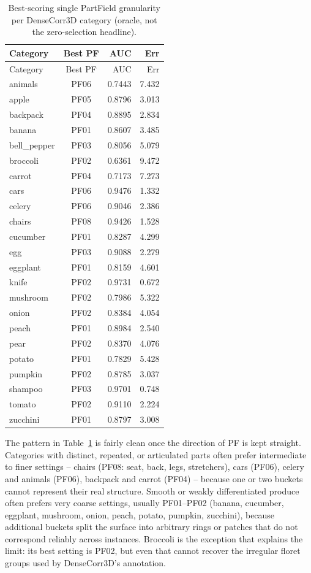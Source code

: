 \documentclass{article}
\begin{document}
\begingroup
\small
\setlength{\tabcolsep}{4pt}
\begin{longtable}{lcrr}
\caption{Best-scoring single PartField granularity per DenseCorr3D category (oracle, not the
zero-selection headline).}
\label{tab:pf-best-per-category}\\
\toprule
Category & Best PF & AUC & Err \\
\midrule
\endfirsthead
\toprule
Category & Best PF & AUC & Err \\
\midrule
\endhead
\bottomrule
\endfoot
animals & PF06 & 0.7443 & 7.432 \\
apple & PF05 & 0.8796 & 3.013 \\
backpack & PF04 & 0.8895 & 2.834 \\
banana & PF01 & 0.8607 & 3.485 \\
bell\_pepper & PF03 & 0.8056 & 5.079 \\
broccoli & PF02 & 0.6361 & 9.472 \\
carrot & PF04 & 0.7173 & 7.273 \\
cars & PF06 & 0.9476 & 1.332 \\
celery & PF06 & 0.9046 & 2.386 \\
chairs & PF08 & 0.9426 & 1.528 \\
cucumber & PF01 & 0.8287 & 4.299 \\
egg & PF03 & 0.9088 & 2.279 \\
eggplant & PF01 & 0.8159 & 4.601 \\
knife & PF02 & 0.9731 & 0.672 \\
mushroom & PF02 & 0.7986 & 5.322 \\
onion & PF02 & 0.8384 & 4.054 \\
peach & PF01 & 0.8984 & 2.540 \\
pear & PF02 & 0.8370 & 4.076 \\
potato & PF01 & 0.7829 & 5.428 \\
pumpkin & PF02 & 0.8785 & 3.037 \\
shampoo & PF03 & 0.9701 & 0.748 \\
tomato & PF02 & 0.9110 & 2.224 \\
zucchini & PF01 & 0.8797 & 3.008 \\
\end{longtable}
\endgroup

The pattern in Table~\ref{tab:pf-best-per-category} is fairly clean once the direction of PF is
kept straight. Categories with distinct, repeated, or articulated parts often prefer intermediate
to finer settings -- chairs (PF08: seat, back, legs, stretchers), cars (PF06), celery and animals
(PF06), backpack and carrot (PF04) -- because one or two buckets cannot represent their real
structure. Smooth or weakly differentiated produce often prefers very coarse settings, usually
PF01--PF02 (banana, cucumber, eggplant, mushroom, onion, peach, potato, pumpkin, zucchini), because
additional buckets split the surface into arbitrary rings or patches that do not correspond
reliably across instances. Broccoli is the exception that explains the limit: its best setting is
PF02, but even that cannot recover the irregular floret groups used by DenseCorr3D's annotation.
\end{document}
